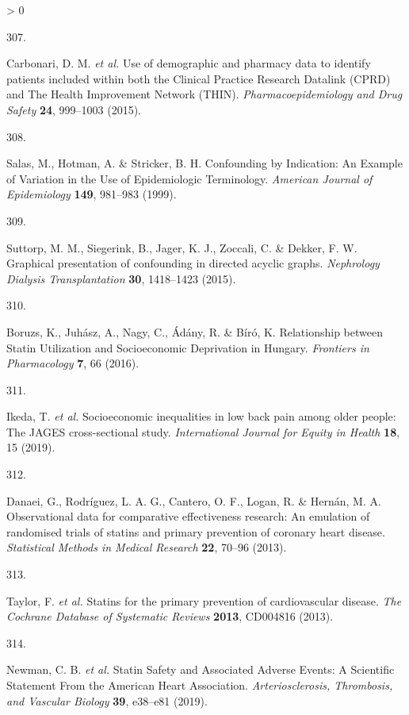 \documentclass[a4paper, twoside]{templates/ociamthesis}
\newlength{\cslhangindent}
\newlength{\csllabelwidth}
\newenvironment{CSLReferences}[3] %
 {%
  \setlength{\parindent}{0pt}
  \ifodd #1 \everypar{\setlength{\hangindent}{\cslhangindent}}\ignorespaces\fi
  \ifnum #2 > 0
  \setlength{\parskip}{#2\baselineskip}
  \fi
 }%
 {}
\newcommand{\CSLLeftMargin}[1]{\parbox[t]{\maxof{\widthof{#1}}{\csllabelwidth}}{#1}}
\newcommand{\CSLRightInline}[1]{\parbox[t]{\linewidth - \csllabelwidth}{#1}}
\begin{document}
\begin{CSLReferences}{0}{0}
\leavevmode\hypertarget{ref-carbonari2015}{}%
\CSLLeftMargin{307. }
\CSLRightInline{Carbonari, D. M. \emph{et al.} Use of demographic and pharmacy data to identify patients included within both the {Clinical Practice Research Datalink} ({CPRD}) and {The Health Improvement Network} ({THIN}). \emph{Pharmacoepidemiology and Drug Safety} \textbf{24}, 999--1003 (2015).}

\leavevmode\hypertarget{ref-salas1999}{}%
\CSLLeftMargin{308. }
\CSLRightInline{Salas, M., Hotman, A. \& Stricker, B. H. Confounding by {Indication}: An {Example} of {Variation} in the {Use} of {Epidemiologic Terminology}. \emph{American Journal of Epidemiology} \textbf{149}, 981--983 (1999).}

\leavevmode\hypertarget{ref-suttorp2015}{}%
\CSLLeftMargin{309. }
\CSLRightInline{Suttorp, M. M., Siegerink, B., Jager, K. J., Zoccali, C. \& Dekker, F. W. Graphical presentation of confounding in directed acyclic graphs. \emph{Nephrology Dialysis Transplantation} \textbf{30}, 1418--1423 (2015).}

\leavevmode\hypertarget{ref-boruzs2016}{}%
\CSLLeftMargin{310. }
\CSLRightInline{Boruzs, K., Juhász, A., Nagy, C., Ádány, R. \& Bíró, K. Relationship between {Statin Utilization} and {Socioeconomic Deprivation} in {Hungary}. \emph{Frontiers in Pharmacology} \textbf{7}, 66 (2016).}

\leavevmode\hypertarget{ref-ikeda2019}{}%
\CSLLeftMargin{311. }
\CSLRightInline{Ikeda, T. \emph{et al.} Socioeconomic inequalities in low back pain among older people: The {JAGES} cross-sectional study. \emph{International Journal for Equity in Health} \textbf{18}, 15 (2019).}

\leavevmode\hypertarget{ref-danaei2013}{}%
\CSLLeftMargin{312. }
\CSLRightInline{Danaei, G., Rodríguez, L. A. G., Cantero, O. F., Logan, R. \& Hernán, M. A. Observational data for comparative effectiveness research: An emulation of randomised trials of statins and primary prevention of coronary heart disease. \emph{Statistical Methods in Medical Research} \textbf{22}, 70--96 (2013).}

\leavevmode\hypertarget{ref-taylor2013}{}%
\CSLLeftMargin{313. }
\CSLRightInline{Taylor, F. \emph{et al.} Statins for the primary prevention of cardiovascular disease. \emph{The Cochrane Database of Systematic Reviews} \textbf{2013}, CD004816 (2013).}

\leavevmode\hypertarget{ref-newman2019}{}%
\CSLLeftMargin{314. }
\CSLRightInline{Newman, C. B. \emph{et al.} Statin {Safety} and {Associated Adverse Events}: A {Scientific Statement From} the {American Heart Association}. \emph{Arteriosclerosis, Thrombosis, and Vascular Biology} \textbf{39}, e38--e81 (2019).}


\end{CSLReferences}
\end{document}
